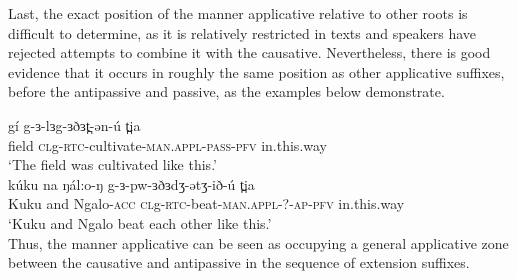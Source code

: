 Last, the exact position of the manner applicative relative to other roots is difficult to determine, as it is relatively restricted in texts and speakers have rejected attempts to combine it with the causative. Nevertheless, there is good evidence that it occurs in roughly the same position as other applicative suffixes, before the antipassive and passive, as the examples below demonstrate.

\ea \gll	gí g-ɜ-lɜg-ɜðɜt̪-ən-ú t̪ia\\
field \textsc{cl}g-\textsc{rtc}-cultivate-\textsc{man.appl-pass-pfv}	in.this.way \\
\glt ‘The field was cultivated like this.’\\
\ex \gll kúku na ŋál:o-ŋ g-ɜ-pw-ɜðɜdʒ-ətʒ-ið-ú 			t̪ia\\
Kuku and Ngalo-\textsc{acc} \textsc{cl}g-\textsc{rtc}-beat-\textsc{man.appl-?-ap-pfv}		in.this.way\\
\glt ‘Kuku and Ngalo beat each other like this.’\\
\z
Thus, the manner applicative can be seen as occupying a general applicative zone between the causative and antipassive in the sequence of extension suffixes.




%
%

%

